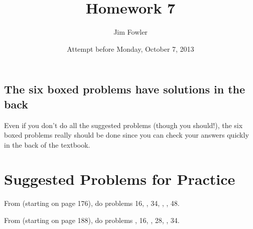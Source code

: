 \documentclass[12pt]{handout}
\title{Homework 7}
\date{Attempt before Monday, October  7, 2013}
\author{Jim Fowler}
\begin{document}
\maketitle










\subsection*{The six boxed problems have solutions in the back}
Even if you don't do all the suggested problems (though you should!), the six boxed problems really should be done since you can check your answers quickly in the back of the textbook.

\section*{Suggested Problems for Practice}

From  (starting on page 176),
do problems 16, , 34, , , 48.
\vspace{1ex}

From  (starting on page 188),
do problems , 16, , 28, , 34.
\vspace{1ex}
\end{document}
